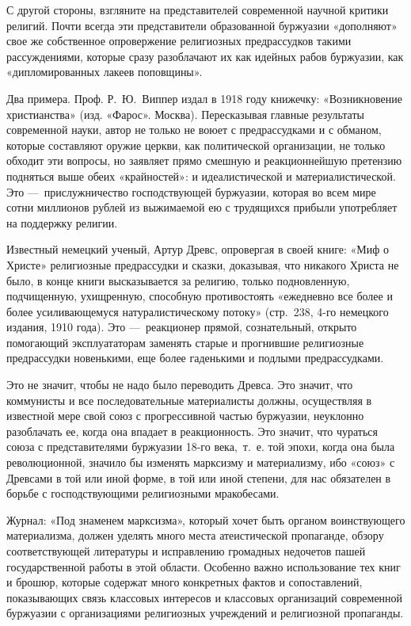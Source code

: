 С другой стороны, взгляните на представителей современной научной критики
религий. Почти всегда эти представители образованной буржуазии «дополняют»
свое же собственное опровержение религиозных предрассудков такими
рассуждениями, которые сразу разоблачают их как идейных рабов буржуазии,
как «дипломированных лакеев поповщины».

Два примера. Проф. Р.~Ю.~Виппер издал в
1918 году книжечку: «Возникновение христианства» (изд. «Фарос». Москва).
Пересказывая главные результаты современной науки, автор не только не воюет
с предрассудками и с обманом, которые составляют оружие церкви, как
политической организации, не только обходит эти вопросы, но заявляет прямо
смешную и реакционнейшую претензию подняться выше обеих «крайностей»: и
идеалистической и материалистической. Это —~прислужничество господствующей
буржуазии, которая во всем мире сотни миллионов рублей из выжимаемой ею с
трудящихся прибыли употребляет на поддержку религии.

Известный немецкий ученый, Артур Древс, опровергая в своей книге: «Миф о
Христе» религиозные предрассудки и сказки, доказывая, что никакого Христа
не было, в конце книги высказывается за религию, только подновленную,
подчищенную, ухищренную, способную противостоять «ежедневно все более и
более усиливающемуся натуралистическому потоку» (стр.~238, 4-го немецкого
издания, 1910 года). Это —~реакционер прямой, сознательный, открыто
помогающий эксплуататорам заменять старые и прогнившие религиозные
предрассудки новенькими, еще более гаденькими и подлыми предрассудками.

Это не значит, чтобы не надо было переводить Древса. Это значит, что
коммунисты и все последовательные материалисты должны, осуществляя в
известной мере свой союз с прогрессивной частью буржуазии, неуклонно
разоблачать ее, когда она впадает в реакционность. Это значит, что чураться
союза с представителями буржуазии 18-го века,~т.~е. той эпохи, когда она
была революционной, значило бы изменять марксизму и материализму, ибо
«союз» с Древсами в той или иной форме, в той или иной степени, для нас
обязателен в борьбе с господствующими религиозными мракобесами.

Журнал: «Под знаменем марксизма», который хочет быть органом воинствующего
материализма, должен уделять много места атеистической пропаганде, обзору
соответствующей литературы и исправлению громадных недочетов пашей
государственной работы в этой области. Особенно важно использование тех
книг и брошюр, которые содержат много конкретных фактов и сопоставлений,
показывающих связь классовых интересов и классовых организаций современной
буржуазии с организациями религиозных учреждений и религиозной пропаганды.

